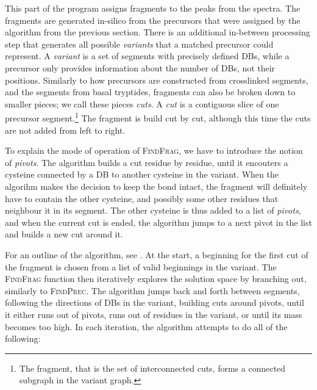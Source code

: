 
This part of the program assigns fragments to the peaks from the spectra. The fragments are generated in-silico from the precursors that were assigned by the algorithm from the previous section. There is an additional in-between processing step that generates all possible \emph{variants} that a matched precursor could represent. A \emph{variant} is a set of segments with precisely defined DBs, while a precursor only provides information about the number of DBs, not their positions. Similarly to how precursors are constructed from crosslinked segments, and the segments from basal tryptides, fragments can also be broken down to smaller pieces; we call these pieces \emph{cuts}. A \emph{cut} is a contiguous slice of one precursor segment.\footnote{The fragment, that is the set of interconnected cuts, forms a connected subgraph in the variant graph.} The fragment is build cut by cut, although this time the cuts are not added from left to right.

To explain the mode of operation of \textsc{FindFrag}, we have to introduce the notion of \emph{pivots}. The algorithm builds a cut residue by residue, until it encouters a cysteine connected by a DB to another cysteine in the variant. When the algorihm makes the decision to keep the bond intact, the fragment will definitely have to contain the other cysteine, and possibly some other residues that neighbour it in its segment. The other cysteine is thus added to a list of \emph{pivots}, and when the current cut is ended, the algorithm jumps to a next pivot in the list and builds a new cut around it.

For an outline of the algorithm, see . At the start, a beginning for the first cut of the fragment is chosen from a list of valid beginnings in the variant. The \textsc{FindFrag} function then iteratively explores the solution space by branching out, similarly to \textsc{FindPrec}. The algorithm jumps back and forth between segments, following the directions of DBs in the variant, building cuts around pivots, until it either runs out of pivots, runs out of residues in the variant, or until its mass becomes too high. In each iteration, the algorithm attempts to do all of the following:


